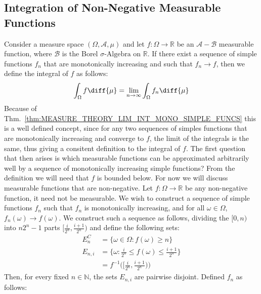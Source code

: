     \subsection{Integration of Non-Negative Measurable Functions}
        Consider a measure space $(\Omega,\mathcal{A},\mu)$ and let
        $f:\Omega\rightarrow\mathbb{R}$ be an $\mathcal{A}-\mathcal{B}$
        measurable function, where $\mathcal{B}$ is the Borel
        $\sigma\textrm{-Algebra}$ on $\mathbb{R}$. If there exist a sequence of
        simple functions $f_{n}$ that are monotonically increasing and such
        that $f_{n}\rightarrow{f}$, then we define the integral of $f$ as
        follows:
        \begin{equation}
            \int_{\Omega}f\diff{\mu}=\underset{n\rightarrow\infty}{\lim}
                \int_{\Omega}f_{n}\diff{\mu}
        \end{equation}
        Because of Thm.~\ref{thm:MEASURE_THEORY_LIM_INT_MONO_SIMPLE_FUNCS} this
        is a well defined concept, since for any two sequences of simples
        functions that are monotonically increasing and converge to $f$, the
        limit of the integrals is the same, thus giving a consitent definition
        to the integral of $f$. The first question that then arises is which
        measurable functions can be approximated arbitrarily well by a sequence
        of monotonically increasing simple functions? From the definition we
        will need that $f$ is bounded below. For now we will discuss measurable
        functions that are non-negative. Let $f:\Omega\rightarrow\mathbb{R}$ be
        any non-negative function, it need not be measurable. We wish to
        construct a sequence of simple functions $f_{n}$ such that $f_{n}$ is
        monotonically increasing, and for all $\omega\in\Omega$,
        $f_{n}(\omega)\rightarrow{f}(\omega)$. We construct such a sequence as
        follows, dividing the $[0,n)$ into $n2^{n}-1$ parts
        $[\frac{i}{2^{n}},\frac{i+1}{2^{n}})$ and define the following sets:
        \begin{align}
            E_{n}^{C}&=\{\omega\in\Omega:f(\omega)\geq{n}\}\\
            E_{n,i}&=\{\omega:\frac{i}{2^{n}}\leq{f}(\omega)
                \leq\frac{i+1}{2^{n}}\}\\
            &=f^{-1}\big([\frac{i}{2^{n}},\frac{i+1}{2^{n}})\big)
        \end{align}
        Then, for every fixed $n\in\mathbb{N}$, the sets $E_{n,i}$ are pairwise
        disjoint. Defined $f_{n}$ as follows:
